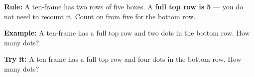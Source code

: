 \documentclass[12pt]{article}
\begin{document}

\begin{formulabox}
\textbf{Rule:} A ten-frame has two rows of five boxes. A \textbf{full top row
is 5} --- you do not need to recount it. Count on from five for the bottom row.
\end{formulabox}

\begin{examplebox}
\textbf{Example:} \quad A ten-frame has a full top row and two dots in the
bottom row. How many dots?
\end{examplebox}

\begin{tryitbox}
\textbf{Try it:} \quad A ten-frame has a full top row and four dots in the
bottom row. How many dots?\\[2pt]
\end{tryitbox}
\end{document}

